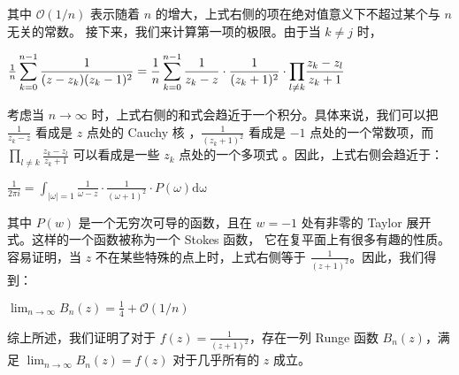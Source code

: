 \documentclass[12pt, a4paper, oneside]{article}
\begin{document}
\begin{spacing}{2.0}
其中 $\mathcal{O}(1/n)$ 表示随着 $n$ 的增大，上式右侧的项在绝对值意义下不超过某个与 $n$ 无关的常数。
接下来，我们来计算第一项的极限。由于当 $k \neq j$ 时，


\begin{center}
    $\frac{1}{n}\displaystyle\sum_{k = 0}^{n-1}\frac{1}{(z-z_k)(z_k - 1)^2} = \frac{1}{n}\displaystyle\sum_{k = 0}^{n-1}\frac{1}{z_k-z}\cdot \frac{1}{(z_k+1)^2} \cdot{\textstyle \displaystyle\prod_{l\neq k}}\frac{z_k - z_l}{z_k + 1}$
\end{center}

考虑当 $n \to \infty$ 时，上式右侧的和式会趋近于一个积分。具体来说，我们可以把 $\frac{1}{z_k-z}$ 看成是 $z$ 点处的 Cauchy 核
，$\frac{1}{(z_k+1)^2}$ 看成是 $-1$ 点处的一个常数项，而 $\displaystyle\prod_{l \neq k} \frac{z_k-z_l}{z_k+1}$ 可以看成是一些 $z_k$ 点处的一个多项式
。因此，上式右侧会趋近于：


\begin{center}
    $\frac{1}{2\pi i} = \displaystyle\int_{|\omega| = 1}\frac{1}{\omega - z}\cdot \frac{1}{(\omega+1)^2}\cdot P(\omega)\mathrm{d\omega}$
\end{center}

其中 $P(w)$ 是一个无穷次可导的函数，且在 $w=-1$ 处有非零的 Taylor 展开式。这样的一个函数被称为一个 Stokes 函数，
它在复平面上有很多有趣的性质。容易证明，当 $z$ 不在某些特殊的点上时，上式右侧等于 $\frac{1}{(z+1)^2}$。因此，我们得到：

\begin{center}
    $\displaystyle\lim_{n\to \infty}B_n(z) = \frac{1}{4} + \mathcal{O}(1/n)$
\end{center}

综上所述，我们证明了对于 $f(z) = \frac{1}{(z+1)^2}$，存在一列 Runge 函数 $B_n(z)$，满足 $\displaystyle\lim_{n \to \infty} B_n(z) = f(z)$ 
对于几乎所有的 $z$ 成立。











\end{spacing}{}



\end{document}
